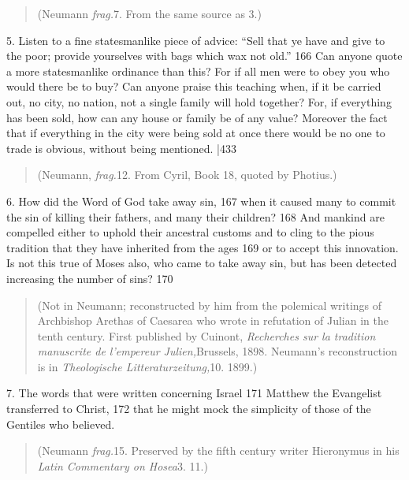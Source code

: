 \begin{quote}

(Neumann \emph{frag.}7. From the same source as 3.)

\end{quote}

5. Listen to a fine statesmanlike piece of advice: ``Sell that ye have and give to the poor; provide yourselves with bags which wax not old.''
166 Can anyone quote a more statesmanlike ordinance than this? For if all men were to obey you who would there be to buy? Can anyone praise this teaching when, if it be carried out, no city, no nation, not a single family will hold together? For, if everything has been sold, how can any house or family be of any value? Moreover the fact that if everything in the city were being sold at once there would be no one to trade is obvious, without being mentioned.
|433

\begin{quote}

(Neumann, \emph{frag.}12. From Cyril, Book 18, quoted by Photius.)

\end{quote}

6. How did the Word of God take away sin, 167 when it caused many to commit the sin of killing their fathers, and many their children?
168 And mankind are compelled either to uphold their ancestral customs and to cling to the pious tradition that they have inherited from the ages
169 or to accept this innovation. Is not this true of Moses also, who came to take away sin, but has been detected increasing the number of sins?
170

\begin{quote}

(Not in Neumann; reconstructed by him from the polemical writings of Archbishop Arethas of Caesarea who wrote in refutation of Julian in the tenth century. First published by
Cuinont, \emph{Recherches sur la tradition manuscrite de l'empereur Julien,}Brussels, 1898. Neumann's reconstruction is in \emph{Theologische Litteraturzeitung,}10. 1899.)

\end{quote}

7. The words that were written concerning Israel
171 Matthew the Evangelist transferred to Christ, 172 that he might mock the simplicity of those of the Gentiles who believed.

\begin{quote}

(Neumann \emph{frag.}15. Preserved by the fifth century writer Hieronymus in his \emph{Latin Commentary on Hosea}3. 11.)

\end{quote}

